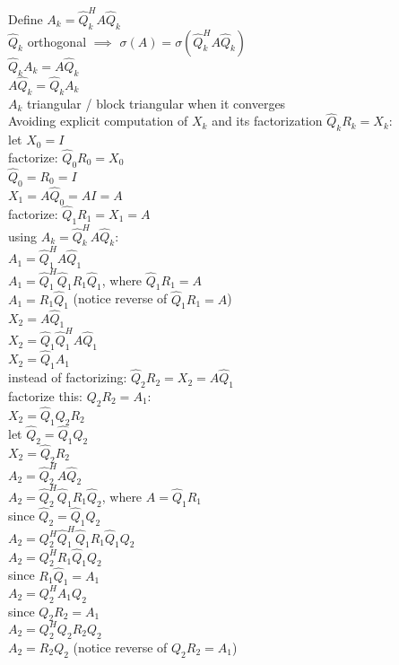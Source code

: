 \documentclass[8pt,letter]{article}
\begin{document}
\begin{multicols*}{2}
    Define $A_k = \hat{Q}_k^H A \hat{Q}_k$\\
    $\hat{Q}_k$ orthogonal $\implies$ $\sigma(A) = \sigma(\hat{Q}_k^H A \hat{Q}_k)$\\
    $\hat{Q}_k A_k = A \hat{Q}_k$\\
    $A \hat{Q}_k = \hat{Q}_k A_k$\\
    $A_k$ triangular / block triangular when it converges\\

    Avoiding explicit computation of $X_k$ and its factorization $\hat{Q}_k R_k = X_k$:\\
    let $X_0 = I$\\
    factorize: $\hat{Q}_0 R_0 = X_0$\\
    $\hat{Q}_0 = R_0 = I$\\
    $X_1 = A \hat{Q}_0 = A I = A$\\
    factorize: $\hat{Q}_1 R_1 = X_1 = A$\\
    using $A_k = \hat{Q}_k^H A \hat{Q}_k$:\\
    $A_1 = \hat{Q}_1^H A \hat{Q}_1$\\
    $A_1 = \hat{Q}_1^H \hat{Q}_1 R_1 \hat{Q}_1$, where $\hat{Q}_1 R_1 = A$\\
    $A_1 = R_1 \hat{Q}_1$ (notice reverse of $\hat{Q}_1 R_1 = A$)\\
    $X_2 = A \hat{Q}_1$\\
   
    $X_2 = \hat{Q}_1 \hat{Q}_1^H A \hat{Q}_1$\\
    $X_2 = \hat{Q}_1 A_1$\\

    instead of factorizing: $\hat{Q}_2 R_2 = X_2 = A \hat{Q}_1$\\
    factorize this: $Q_2 R_2 = A_1$:\\
    $X_2 = \hat{Q}_1 Q_2 R_2$\\
    let $\hat{Q}_2 = \hat{Q}_1 Q_2$\\
    $X_2 = \hat{Q}_2 R_2$\\

    $A_2 = \hat{Q}_2^H A \hat{Q}_2$\\
    $A_2 = \hat{Q}_2^H \hat{Q}_1 R_1 \hat{Q}_2$, where $A = \hat{Q}_1 R_1$\\
    since $\hat{Q}_2 = \hat{Q}_1 Q_2$\\
    $A_2 = Q_2^H \hat{Q}_1^H \hat{Q}_1 R_1 \hat{Q}_1 Q_2$\\
    $A_2 = Q_2^H R_1 \hat{Q}_1 Q_2$\\    
    since $R_1 \hat{Q}_1 = A_1$\\
    $A_2 = Q_2^H A_1 Q_2$\\
    since $Q_2 R_2 = A_1$\\
    $A_2 = Q_2^H Q_2 R_2 Q_2$\\
    $A_2 = R_2 Q_2$ (notice reverse of $Q_2 R_2 = A_1$)\\


\end{multicols*}
\end{document}

